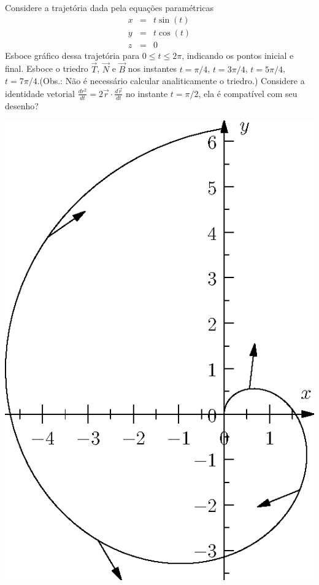 \begin{exer} Considere a trajetória dada pela equações paramétricas
\begin{eqnarray*}
x&=&t\sin (t)\\
y&=&t\cos (t)\\
z&=&0
\end{eqnarray*}
Esboce gráfico dessa trajetória para $0\leq t \leq 2\pi$, indicando os pontos inicial e final. Esboce o triedro $\vec{T}$, $\vec{N}$ e $\vec{B}$ nos instantes $t=\pi/4$, $t=3\pi/4$, $t=5\pi/4$, $t=7\pi/4$.(Obs.: Não é necessário calcular analiticamente o triedro.) Considere a identidade vetorial $\frac{d r^2}{dt}=2\vec{r}\cdot\frac{d\vec{r}}{dt}$ no instante $t=\pi/2$, ela é compatível com seu desenho?
\end{exer}
\begin{resp}
 \includegraphics{./cap_curvas/figs/espiral}
\end{resp}

